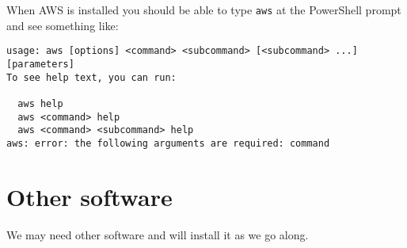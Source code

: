 When AWS is installed you should be able to type \texttt{aws} at the PowerShell prompt and see something like:
\begin{verbatim}
usage: aws [options] <command> <subcommand> [<subcommand> ...] [parameters]
To see help text, you can run:

  aws help
  aws <command> help
  aws <command> <subcommand> help
aws: error: the following arguments are required: command
\end{verbatim}

\section{Other software}

We may need other software and will install it as we go along.

